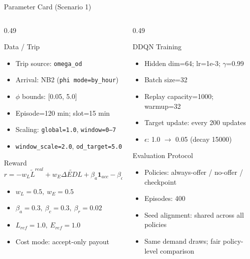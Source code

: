 ﻿\documentclass[aspectratio=169]{beamer}
\newcommand{\tightlist}{\setlength{\itemsep}{4pt}\setlength{\parskip}{0pt}}
\begin{document}
\begin{frame}{Parameter Card (Scenario 1)}
\scriptsize
\begin{columns}[T,onlytextwidth]
\begin{column}{0.49\textwidth}
\begin{block}{Data / Trip}
\begin{itemize}\tightlist
  \item Trip source: \texttt{omega\_od}
  \item Arrival: NB2 (\texttt{phi mode=by\_hour})
  \item $\phi$ bounds: [0.05, 5.0]
  \item Episode=120 min; slot=15 min
  \item Scaling: \texttt{global=1.0}, \texttt{window=0--7}
  \item \texttt{window\_scale=2.0}, \texttt{od\_target=5.0}
\end{itemize}
\end{block}

\begin{block}{Reward}
\[
r=-w_L\tilde L^{real}+w_E\tilde{\Delta EDL}
+\beta_a\mathbf{1}_{acc}-\beta_c Cost-\beta_r\mathbf{1}_{rej}
\]
\begin{itemize}\tightlist
  \item $w_L=0.5,\ w_E=0.5$
  \item $\beta_a=0.3,\ \beta_c=0.3,\ \beta_r=0.02$
  \item $L_{ref}=1.0,\ E_{ref}=1.0$
  \item Cost mode: accept-only payout
\end{itemize}
\end{block}
\end{column}
\begin{column}{0.49\textwidth}
\begin{block}{DDQN Training}
\begin{itemize}\tightlist
  \item Hidden dim=64; lr=1e-3; $\gamma$=0.99
  \item Batch size=32
  \item Replay capacity=1000; warmup=32
  \item Target update: every 200 updates
  \item $\epsilon$: 1.0 $\rightarrow$ 0.05 (decay 15000)
\end{itemize}
\end{block}

\begin{block}{Evaluation Protocol}
\begin{itemize}\tightlist
  \item Policies: always-offer / no-offer / checkpoint
  \item Episodes: 400
  \item Seed alignment: shared across all policies
  \item Same demand draws; fair policy-level comparison
\end{itemize}
\end{block}
\end{column}
\end{columns}
\end{frame}
\end{document}
